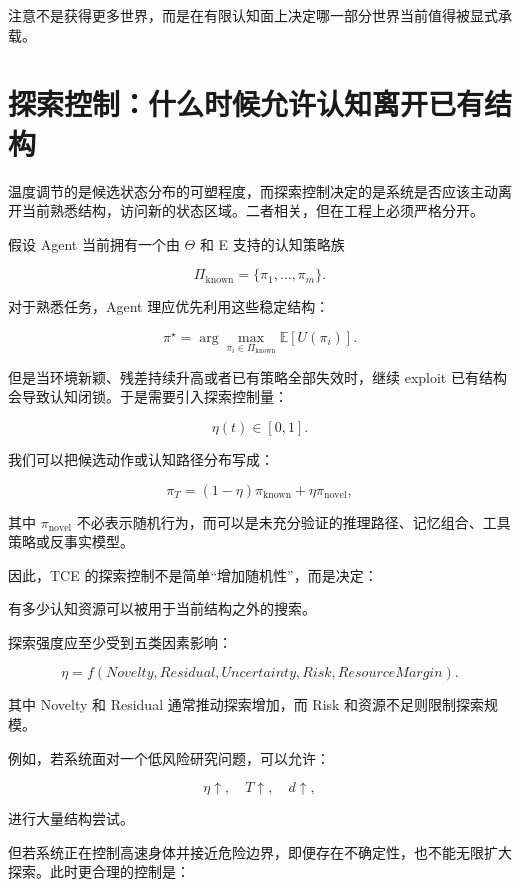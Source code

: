 \begin{proposition*}
注意不是获得更多世界，而是在有限认知面上决定哪一部分世界当前值得被显式承载。
\end{proposition*}

\section{探索控制：什么时候允许认知离开已有结构}

温度调节的是候选状态分布的可塑程度，而探索控制决定的是系统是否应该主动离开当前熟悉结构，访问新的状态区域。二者相关，但在工程上必须严格分开。

假设 Agent 当前拥有一个由 $\Theta$ 和 E 支持的认知策略族

\[
\Pi_{\mathrm{known}}
=
\{\pi_1,\ldots,\pi_m\}.
\]

对于熟悉任务，Agent 理应优先利用这些稳定结构：

\[
\pi^\star
=
\arg\max_{\pi_i\in\Pi_{\mathrm{known}}}
\mathbb E[U(\pi_i)].
\]

但是当环境新颖、残差持续升高或者已有策略全部失效时，继续 exploit 已有结构会导致认知闭锁。于是需要引入探索控制量：

\[
\eta(t)\in[0,1].
\]

我们可以把候选动作或认知路径分布写成：

\[
\pi_T
=
(1-\eta)\pi_{\mathrm{known}}
+
\eta\pi_{\mathrm{novel}},
\]

其中 $\pi_{\mathrm{novel}}$ 不必表示随机行为，而可以是未充分验证的推理路径、记忆组合、工具策略或反事实模型。

因此，TCE 的探索控制不是简单“增加随机性”，而是决定：

\begin{statementbox}
有多少认知资源可以被用于当前结构之外的搜索。
\end{statementbox}

探索强度应至少受到五类因素影响：

\[
\eta
=
f(
Novelty,
Residual,
Uncertainty,
Risk,
ResourceMargin
).
\]

其中 Novelty 和 Residual 通常推动探索增加，而 Risk 和资源不足则限制探索规模。

例如，若系统面对一个低风险研究问题，可以允许：

\[
\eta\uparrow,
\quad
T\uparrow,
\quad
d\uparrow,
\]

进行大量结构尝试。

但若系统正在控制高速身体并接近危险边界，即便存在不确定性，也不能无限扩大探索。此时更合理的控制是：

